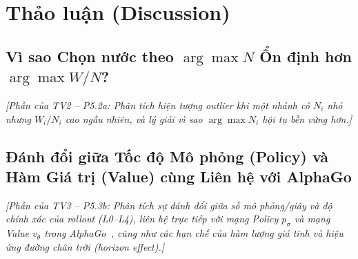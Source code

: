 \section{Thảo luận (Discussion)}
\label{sec:discussion}

\subsection{Vì sao Chọn nước theo $\arg\max N$ Ổn định hơn $\arg\max W/N$?}
\label{subsec:discussion_n_vs_q}

\textit{[Phần của TV2 -- P5.2a: Phân tích hiện tượng outlier khi một nhánh có $N_i$ nhỏ nhưng $W_i/N_i$ cao ngẫu nhiên, và lý giải vì sao $\arg\max N_i$ hội tụ bền vững hơn.]}

\subsection{Đánh đổi giữa Tốc độ Mô phỏng (Policy) và Hàm Giá trị (Value) cùng Liên hệ với AlphaGo}
\label{subsec:discussion_policy_value}

\textit{[Phần của TV3 -- P5.3b: Phân tích sự đánh đổi giữa số mô phỏng/giây và độ chính xác của rollout (L0--L4), liên hệ trực tiếp với mạng Policy $p_\sigma$ và mạng Value $v_\theta$ trong AlphaGo~\cite{silver2016mastering}, cũng như các hạn chế của hàm lượng giá tĩnh và hiệu ứng đường chân trời (horizon effect).]}
